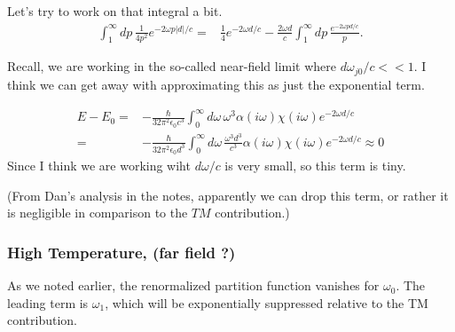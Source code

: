 Let's try to work on that integral a bit.  
\begin{align}
\int_1^\infty dp\,\frac{1}{4p^2}e^{-2\omega p|d|/c}%
=& \frac{1}{4}e^{-2\omega d/c} - \frac{2\omega d}{c} \int_1^\infty dp\, \frac{e^{-2\omega pd/c}}{p}.
\end{align}

Recall, we are working in the so-called near-field limit where $d\omega_{j0}/c<<1.$  
I think we can get away with approximating this as just the exponential term.  

\begin{align}
E-E_0=&-\frac{\hbar}{32\pi^2\epsilon_0c^3}\int_0^\infty d\omega\,\omega^3\alpha(i\omega)\chi(i\omega)e^{-2\omega d/c}\\
=&-\frac{\hbar}{32\pi^2\epsilon_0 d^3}\int_0^\infty d\omega\,\frac{\omega^3d^3}{c^3}\alpha(i\omega)\chi(i\omega)e^{-2\omega d/c}\approx 0
\end{align}
Since I think we are working wiht $d\omega/c$ is very small, so this term is tiny.  

(From Dan's analysis in the notes, apparently we can drop this term, or rather it is negligible in comparison to the $TM$ contribution.)


\subsubsection{High Temperature, (far field ?)}  

As we noted earlier, the renormalized partition function vanishes for $\omega_0$.
The leading term is $\omega_1$, which will be exponentially suppressed relative to the TM contribution.  





